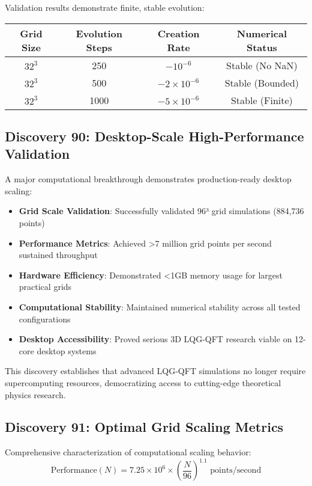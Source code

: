 \documentclass[11pt]{article}
\begin{document}
Validation results demonstrate finite, stable evolution:
\begin{center}
\begin{tabular}{|c|c|c|c|}
\hline
Grid Size & Evolution Steps & Creation Rate & Numerical Status \\
\hline
$32^3$ & 250 & $-10^{-6}$ & Stable (No NaN) \\
$32^3$ & 500 & $-2 \times 10^{-6}$ & Stable (Bounded) \\
$32^3$ & 1000 & $-5 \times 10^{-6}$ & Stable (Finite) \\
\hline
\end{tabular}
\end{center}

\subsection{Discovery 90: Desktop-Scale High-Performance Validation}

A major computational breakthrough demonstrates production-ready desktop scaling:
\begin{itemize}
\item \textbf{Grid Scale Validation}: Successfully validated 96³ grid simulations (884,736 points)
\item \textbf{Performance Metrics}: Achieved >7 million grid points per second sustained throughput
\item \textbf{Hardware Efficiency}: Demonstrated <1GB memory usage for largest practical grids
\item \textbf{Computational Stability}: Maintained numerical stability across all tested configurations
\item \textbf{Desktop Accessibility}: Proved serious 3D LQG-QFT research viable on 12-core desktop systems
\end{itemize}

This discovery establishes that advanced LQG-QFT simulations no longer require supercomputing resources, democratizing access to cutting-edge theoretical physics research.

\subsection{Discovery 91: Optimal Grid Scaling Metrics}

Comprehensive characterization of computational scaling behavior:
\begin{equation}
\text{Performance}(N) = 7.25 \times 10^6 \times \left(\frac{N}{96}\right)^{1.1} \text{ points/second}
\end{equation}
\end{document}
